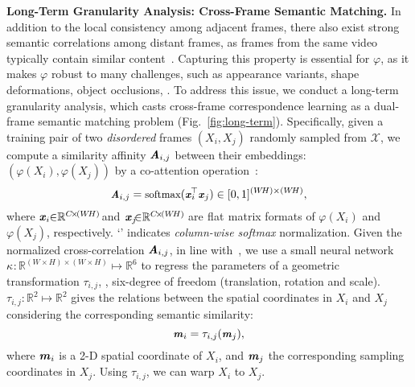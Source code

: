 \documentclass[10pt,twocolumn,letterpaper]{article}
\begin{document}
\noindent\textbf{Long-Term Granularity Analysis: Cross-Frame Semantic Matching.} In addition to the local consistency among adjacent frames, there also exist strong semantic correlations among distant frames, as frames from the same video typically contain similar
content~\!\cite{Hossein2009,yan2019fine}. Capturing this property is essential for $\varphi$, as it makes $\varphi$ robust to many challenges, such as appearance variants, shape deformations, object occlusions, \etc. To address this issue, we conduct a long-term granularity analysis, which casts cross-frame correspondence learning as a dual-frame semantic matching problem (Fig.~\!\ref{fig:long-term}). Specifically, given a training pair of two \textit{disordered} frames $(X_i, X_j)$ randomly sampled from $\mathcal{X}$, we compute a similarity affinity $\textbf{\textit{A}}_{i,j}$ between their embeddings: $(\varphi(X_i), \varphi(X_j))$ by a co-attention operation~\!\cite{DBLP:conf/nips/VaswaniSPUJGKP17}:
\vspace{-1pt}
\begin{equation}\small
\textbf{\textit{A}}_{i,j}=\text{softmax}({\textbf{\textit{x}}_i}^{\!\!\!\top}\textbf{\textit{x}}_j)\in [0, 1]^{(W\!H)\times (W\!H)},
\label{equ:long-coattention}
\vspace{-0pt}
\end{equation}
where ${\textbf{\textit{x}}_{i\!}}\!\in_{\!}\!\mathbb{R}^{C\!\times\!(W\!H)\!\!}$ and$_{\!}$ ${\textbf{\textit{x}}_{j\!}}\!\!\in_{\!}\!\mathbb{R}^{C\!\times\!(W\!H)\!}$ are$_{\!}$ flat$_{\!}$ matrix formats of $\varphi(X_i)$ and $\varphi(X_j)$, respectively. `' indicates \textit{column-wise softmax} normalization.
Given the normalized cross-correlation $\textbf{\textit{A}}_{i,j}$, in line with~\!\cite{rocco2018end}, we use a small neural network $\kappa_{\!}\!:\!\mathbb{R}^{(W\!\times\!H)\!\times\!(W\!\times\!H)\!\!}\!\mapsto\!\mathbb{R}^{6\!}$ to regress the parameters of a geometric transformation $\tau_{i,j}$, \ie, six-degree of freedom (translation, rotation and scale). $\tau_{i,j\!}\!:\!\mathbb{R}^{2}\!\mapsto\!\mathbb{R}^{2}$ gives the relations between the spatial coordinates in $X_i$ and $X_j$ considering the corresponding semantic similarity:
\vspace{-2pt}
\begin{equation}\small
\textbf{\textit{m}}_i=\tau_{i,j}(\textbf{\textit{m}}_j),
\vspace{-1pt}
\end{equation}
where $\textbf{\textit{m}}_i$ is a 2-D spatial coordinate of $X_i$, and $\textbf{\textit{m}}_j$ the corresponding sampling coordinates in $X_j$. Using $\tau_{i,j}$, we can warp $X_i$ to $X_j$.
\end{document}
